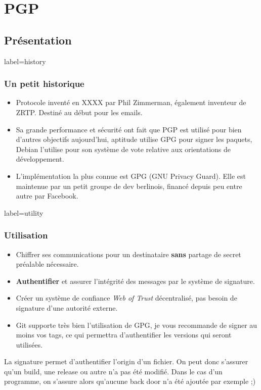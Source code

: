 \documentclass{beamer}
\begin{document}
    \section{PGP}
    \subsection{Présentation}
        \begin{frame}{label=history}
            \frametitle{Un petit historique}
            \begin{center}
                \begin{itemize}
                    \item Protocole inventé en XXXX par Phil Zimmerman, également inventeur de ZRTP. Destiné au début pour les emails.
                    \item Sa grande performance et sécurité ont fait que PGP est utilisé pour bien d'autres objectifs aujourd'hui, aptitude utilise GPG pour signer les paquets, Debian l'utilise pour son système de vote relative aux orientations de développement.
                    \item L'implémentation la plus connue est GPG (GNU Privacy Guard). Elle est maintenue par un petit groupe de dev berlinois, financé depuis peu entre autre par Facebook.
                \end{itemize}
            \end{center}
        \end{frame}
        \begin{frame}{label=utility}
            \frametitle{Utilisation}
            \begin{center}
                \begin{itemize}
                    \item Chiffrer ses communications pour un destinataire \textbf{sans} partage de secret préalable nécessaire.
                    \item \textbf{Authentifier} et assurer l'intégrité des messages par le système de signature.
                    \item Créer un système de confiance \textit{Web of Trust} décentralisé, pas besoin de signature d'une autorité externe.
                    \item Git supporte très bien l'utilisation de GPG, je vous recommande de signer au moins vos tags, ce qui permettra d'authentifier les versions qui seront utilisées.
                \end{itemize}
                \begin{tcolorbox}[colback=green!5,colframe=green!40!black,title=Pourquoi authentifier ?]
                    La signature permet d'authentifier l'origin d'un fichier. On peut donc s'assurer qu'un build, une release ou autre n'a pas été modifié.
                    Dans le cas d'un programme, on s'assure alors qu'aucune back door n'a été ajoutée par exemple ;)
                \end{tcolorbox}
            \end{center}
        \end{frame}
        \appendix
        \begin{frame}
            {}
            
        \end{frame}
\end{document}
